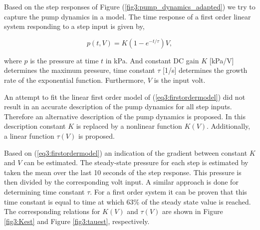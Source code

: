 Based on the step responses of Figure (\ref{fig3:pump_dynamics_adapted}) we try to capture the pump dynamics in a model. The time response of a first order linear system responding to a step input is given by, 

\begin{equation}
    p(t,V) = K(1-e^{-t/\tau})V,
    \label{eq3:firstordermodel}
\end{equation}

where $p$ is the pressure at time $t$ in kPa. And constant DC gain $K$ [kPa/V] determines the maximum pressure, time constant $\tau$ [1/s] determines the growth rate of the exponential function. Furthermore, $V$ is the input volt. 

An attempt to fit the linear first order model of (\ref{eq3:firstordermodel}) did not result in an accurate description of the pump dynamics for all step inputs. Therefore an alternative description of the pump dynamics is proposed. In this description constant $K$ is replaced by a nonlinear function $K(V)$. Additionally, a linear function $\tau(V)$ is proposed. 

Based on (\ref{eq3:firstordermodel}) an indication of the gradient between constant $K$ and $V$ can be estimated. The steady-state pressure for each step is estimated by taken the mean over the last 10 seconds of the step response. This pressure is then divided by the corresponding volt input. A similar approach is done for determining time constant $\tau$. For a first order system it can be proven that this time constant is equal to time at which 63\% of the steady state value is reached. The corresponding relations for $K(V)$ and $\tau(V)$ are shown in Figure \ref{fig3:Kest} and Figure \ref{fig3:tauest}, respectively.

